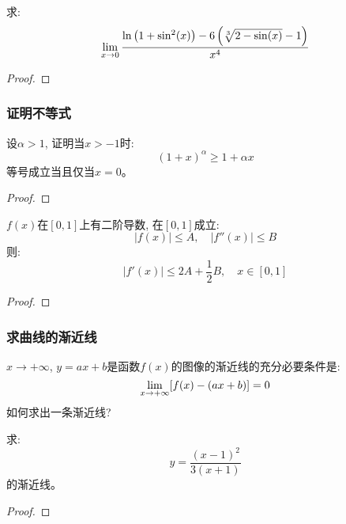 \begin{example}
    求:
    \begin{equation*}
        \lim_{x \to 0 } \frac{\ln\left(1+\sin^2(x)\right)-6\left(\sqrt[3]{2-\sin(x)}-1\right)}{x^4}
    \end{equation*}
\end{example}
\begin{proof}
    
\end{proof}

\subsubsection{证明不等式}
\begin{example}
    设$\alpha > 1$, 证明当$x > -1$时:
    \begin{equation*}
        (1+x)^\alpha \ge 1 + \alpha x
    \end{equation*}
    等号成立当且仅当$x = 0$。
\end{example}
\begin{proof}
    
\end{proof}

\begin{example}
    $f(x)$在$[0, 1]$上有二阶导数, 在$[0, 1]成立$:
    \begin{equation*}
        \left|f(x)\right| \le A, \quad \left|f''(x)\right| \le B
    \end{equation*}
    则:
    \begin{equation*}
        \left| f'(x) \right| \le 2A + \frac{1}{2}B, \quad x \in [0, 1]
    \end{equation*}
\end{example}
\begin{proof}
    
\end{proof}

\subsubsection{求曲线的渐近线}
$x \to +\infty$, $y = ax + b$是函数$f(x)$的图像的渐近线的充分必要条件是:
\begin{equation*}
    \lim_{x \to +\infty } [f(x) - (ax + b)] = 0
\end{equation*}
如何求出一条渐近线?

\begin{example}
    求:
    \begin{equation*}
        y = \frac{(x-1)^2}{3(x+1)}   
    \end{equation*}
    的渐近线。
\end{example}
\begin{proof}
    
\end{proof}

